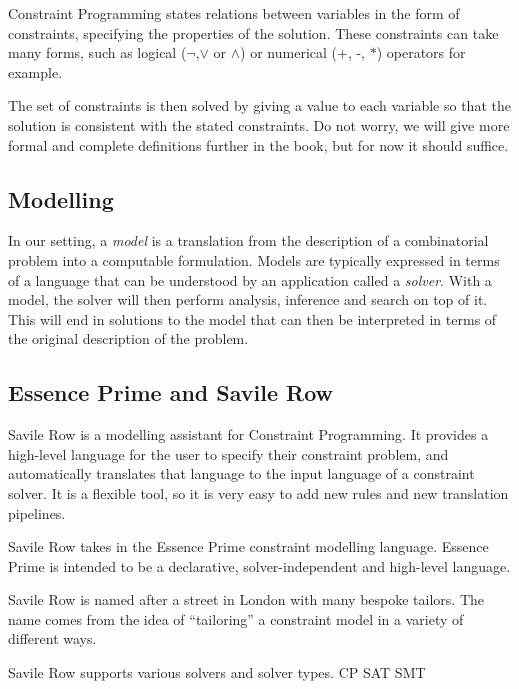Constraint Programming states relations between variables in the form of
constraints, specifying the properties of the solution. These constraints can
take many forms, such as logical ($\neg$,$\vee$ or $\wedge$) or numerical (+,
-, $*$) operators for example.

The set of constraints is then solved by giving a value to each variable so
that the solution is consistent with the stated constraints.  Do not worry, we
will give more formal and complete definitions further in the book, but for now
it should suffice.

\subsection{Modelling}

In our setting, a \emph{model} is a translation from the description of a
combinatorial problem into a computable formulation. Models are typically
expressed in terms of a language that can be understood by an application
called a \emph{solver}. With a model, the solver will then perform analysis, 
inference and search on top of it. This will end in solutions to the model that
can then be interpreted in terms of the original description of the problem. 


\subsection{Essence Prime and Savile Row}

Savile Row is a modelling assistant for Constraint Programming. It provides a
high-level language for the user to specify their constraint problem, and
automatically translates that language to the input language of a constraint
solver. It is a flexible tool, so it is very easy to add new rules and new
translation pipelines.

Savile Row takes in the Essence Prime constraint modelling language. Essence
Prime is intended to be a declarative, solver-independent and high-level language. 

Savile Row is named after a street in London with many bespoke tailors. The
name comes from the idea of ``tailoring'' a constraint model in a variety of
different ways.


Savile Row supports various solvers and solver types.
CP
SAT
SMT

